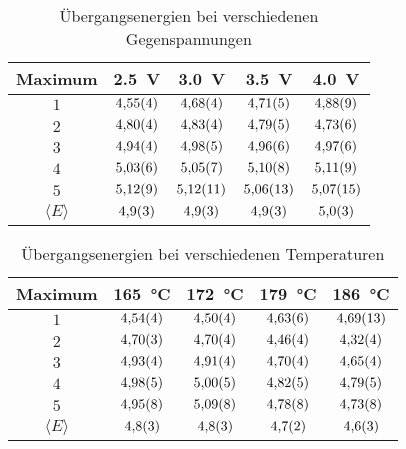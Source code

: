 \begin{table}[htb]
   \centering
\caption{Übergangsenergien bei verschiedenen Gegenspannungen}
\begin{tabular}{c c c c c}
\hline Maximum & \SI{2.5}{\volt} & \SI{3.0}{\volt} & \SI{3.5}{\volt} & \SI{4.0}{\volt} \\ 
\hline
$\num{1}$ & $\num{4.55\pm 0.04}$ & $\num{4.68\pm 0.04}$ & $\num{4.71\pm 0.05}$ & $\num{4.88\pm 0.09}$ \\
$\num{2}$ & $\num{4.80\pm 0.04}$ & $\num{4.83\pm 0.04}$ & $\num{4.79\pm 0.05}$ & $\num{4.73\pm 0.06}$ \\
$\num{3}$ & $\num{4.94\pm 0.04}$ & $\num{4.98\pm 0.05}$ & $\num{4.96\pm 0.06}$ & $\num{4.97\pm 0.06}$ \\
$\num{4}$ & $\num{5.03\pm 0.06}$ & $\num{5.05\pm 0.07}$ & $\num{5.10\pm 0.08}$ & $\num{5.11\pm 0.09}$ \\
$\num{5}$ & $\num{5.12\pm 0.09}$ & $\num{5.12\pm 0.11}$ & $\num{5.06\pm 0.13}$ & $\num{5.07\pm 0.15}$ \\
$\langle E\rangle$ & $\num{4.9\pm 0.3}$ & $\num{4.9\pm 0.3}$ & $\num{4.9\pm 0.3}$ & $\num{5.0\pm 0.3}$ \\
\hline\end{tabular}
\label{fig:energy_gegen}
\end{table}\begin{table}[htb]
   \centering
\caption{Übergangsenergien bei verschiedenen Temperaturen}
\begin{tabular}{c c c c c}
\hline Maximum & \SI{165}{\celsius} & \SI{172}{\celsius} & \SI{179}{\celsius} & \SI{186}{\celsius} \\ 
\hline
$\num{1}$ & $\num{4.54\pm 0.04}$ & $\num{4.50\pm 0.04}$ & $\num{4.63\pm 0.06}$ & $\num{4.69\pm 0.13}$ \\
$\num{2}$ & $\num{4.70\pm 0.03}$ & $\num{4.70\pm 0.04}$ & $\num{4.46\pm 0.04}$ & $\num{4.32\pm 0.04}$ \\
$\num{3}$ & $\num{4.93\pm 0.04}$ & $\num{4.91\pm 0.04}$ & $\num{4.70\pm 0.04}$ & $\num{4.65\pm 0.04}$ \\
$\num{4}$ & $\num{4.98\pm 0.05}$ & $\num{5.00\pm 0.05}$ & $\num{4.82\pm 0.05}$ & $\num{4.79\pm 0.05}$ \\
$\num{5}$ & $\num{4.95\pm 0.08}$ & $\num{5.09\pm 0.08}$ & $\num{4.78\pm 0.08}$ & $\num{4.73\pm 0.08}$ \\
$\langle E\rangle$ & $\num{4.8\pm 0.3}$ & $\num{4.8\pm 0.3}$ & $\num{4.7\pm 0.2}$ & $\num{4.6\pm 0.3}$ \\
\hline\end{tabular}
\label{fig:energy_temp}
\end{table}